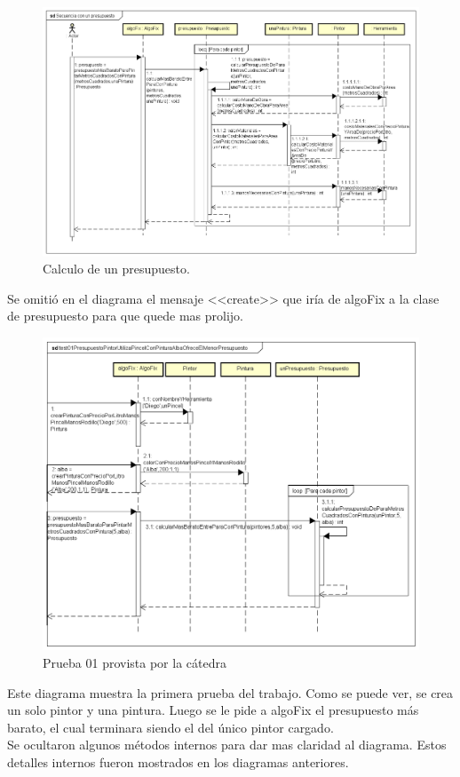 \documentclass[titlepage,a4paper]{article}
\begin{document}
\begin{figure}[H]
\centering
\includegraphics[width=1.1\textwidth]{Secuencia con un presupuesto.png}
\caption{\label{fig:seq03}Calculo de un presupuesto.}
\end{figure}
\indent Se omitió en el diagrama el mensaje <<create>> que iría de algoFix a la clase de presupuesto para que quede mas prolijo. 
\begin{figure}[H]
\centering
\includegraphics[width=1\textwidth]{test01PresupuestoPintorUtilizaPincelConPinturaAlbaOfreceElMenorPresupuesto.png}
\caption{\label{fig:seq01}Prueba 01 provista por la cátedra}
\end{figure}
\indent Este diagrama muestra la primera prueba del trabajo. Como se puede ver, se crea un solo pintor y una pintura. Luego se le pide a algoFix el presupuesto más barato, el cual terminara siendo el del único pintor cargado. \\
\indent Se ocultaron algunos métodos internos para dar mas claridad al diagrama. Estos detalles internos fueron mostrados en los diagramas anteriores.
\end{document}

